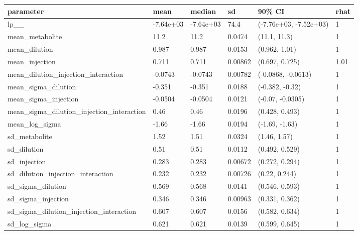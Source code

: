 
\begin{tabular}{l|l|l|l|l|l}
\hline
parameter & mean & median & sd & 90\% CI & rhat\\
\hline
lp\_\_ & -7.64e+03 & -7.64e+03 & 74.4 & (-7.76e+03, -7.52e+03) & 1\\
\hline
mean\_metabolite & 11.2 & 11.2 & 0.0474 & (11.1, 11.3) & 1\\
\hline
mean\_dilution & 0.987 & 0.987 & 0.0153 & (0.962, 1.01) & 1\\
\hline
mean\_injection & 0.711 & 0.711 & 0.00862 & (0.697, 0.725) & 1.01\\
\hline
mean\_dilution\_injection\_interaction & -0.0743 & -0.0743 & 0.00782 & (-0.0868, -0.0613) & 1\\
\hline
mean\_sigma\_dilution & -0.351 & -0.351 & 0.0188 & (-0.382, -0.32) & 1\\
\hline
mean\_sigma\_injection & -0.0504 & -0.0504 & 0.0121 & (-0.07, -0.0305) & 1\\
\hline
mean\_sigma\_dilution\_injection\_interaction & 0.46 & 0.46 & 0.0196 & (0.428, 0.493) & 1\\
\hline
mean\_log\_sigma & -1.66 & -1.66 & 0.0194 & (-1.69, -1.63) & 1\\
\hline
sd\_metabolite & 1.52 & 1.51 & 0.0324 & (1.46, 1.57) & 1\\
\hline
sd\_dilution & 0.51 & 0.51 & 0.0112 & (0.492, 0.529) & 1\\
\hline
sd\_injection & 0.283 & 0.283 & 0.00672 & (0.272, 0.294) & 1\\
\hline
sd\_dilution\_injection\_interaction & 0.232 & 0.232 & 0.00726 & (0.22, 0.244) & 1\\
\hline
sd\_sigma\_dilution & 0.569 & 0.568 & 0.0141 & (0.546, 0.593) & 1\\
\hline
sd\_sigma\_injection & 0.346 & 0.346 & 0.00963 & (0.331, 0.362) & 1\\
\hline
sd\_sigma\_dilution\_injection\_interaction & 0.607 & 0.607 & 0.0156 & (0.582, 0.634) & 1\\
\hline
sd\_log\_sigma & 0.621 & 0.621 & 0.0139 & (0.599, 0.645) & 1\\
\hline
\end{tabular}
